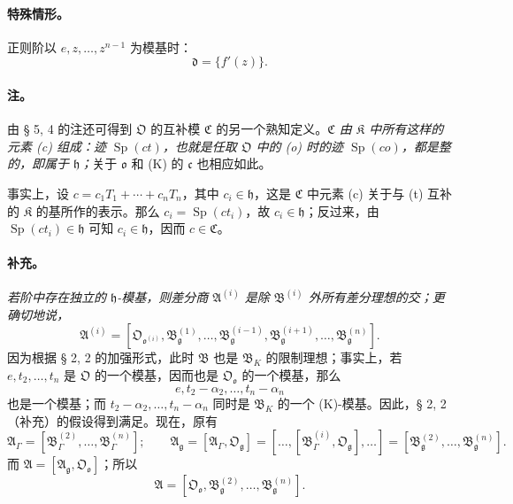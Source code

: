 \paragraph{特殊情形。}
正则阶以 \(e,z,\ldots,z^{n-1}\) 为模基时：
\[
\mathfrak d=\{f'(z)\}.
\]

\paragraph{注。}
由 § 5, 4 的注还可得到 \(\mathfrak O\) 的互补模 \(\mathfrak C\) 的另一个熟知定义。\emph{\(\mathfrak C\) 由 \(\mathfrak K\) 中所有这样的元素 (c) 组成：迹 \(\operatorname{Sp}(ct)\)，也就是任取 \(\mathfrak O\) 中的 (o) 时的迹 \(\operatorname{Sp}(co)\)，都是整的，即属于 \(\mathfrak h\)；}关于 \(\mathfrak o\) 和 (K) 的 \(\mathfrak c\) 也相应如此。

事实上，设 \(c=c_1T_1+\cdots+c_nT_n\)，其中 \(c_i\in\mathfrak h\)，这是 \(\mathfrak C\) 中元素 (c) 关于与 (t) 互补的 \(\mathfrak K\) 的基所作的表示。那么 \(c_i=\operatorname{Sp}(ct_i)\)，故 \(c_i\in\mathfrak h\)；反过来，由 \(\operatorname{Sp}(ct_i)\in\mathfrak h\) 可知 \(c_i\in\mathfrak h\)，因而 \(c\in\mathfrak C\)。

\paragraph{补充。}
\emph{若阶中存在独立的 \(\mathfrak h\)-模基，则差分商 \(\mathfrak A^{(i)}\) 是除 \(\mathfrak B^{(i)}\) 外所有差分理想的交；更确切地说，}
\[
\mathfrak A^{(i)}=
[\mathfrak O_{\mathfrak o^{(i)}},
\mathfrak B_{\mathfrak g}^{(1)},\ldots,
\mathfrak B_{\mathfrak g}^{(i-1)},
\mathfrak B_{\mathfrak g}^{(i+1)},\ldots,
\mathfrak B_{\mathfrak g}^{(n)}].
\]
因为根据 § 2, 2 的加强形式，此时 \(\mathfrak B\) 也是 \(\mathfrak B_K\) 的限制理想；事实上，若 \(e,t_2,\ldots,t_n\) 是 \(\mathfrak O\) 的一个模基，因而也是 \(\mathfrak O_{\mathfrak o}\) 的一个模基，那么
\[
e,t_2-\alpha_2,\ldots,t_n-\alpha_n
\]
也是一个模基；而 \(t_2-\alpha_2,\ldots,t_n-\alpha_n\) 同时是 \(\mathfrak B_K\) 的一个 (K)-模基。因此，§ 2, 2（补充）的假设得到满足。现在，原有
\[
\mathfrak A_\Gamma=[\mathfrak B_\Gamma^{(2)},\ldots,\mathfrak B_\Gamma^{(n)}];
\qquad
\mathfrak A_\mathfrak g=[\mathfrak A_\Gamma,\mathfrak O_\mathfrak g]
=[\ldots,[\mathfrak B_\Gamma^{(i)},\mathfrak O_\mathfrak g],\ldots]
=[\mathfrak B_\mathfrak g^{(2)},\ldots,\mathfrak B_\mathfrak g^{(n)}].
\]
而 \(\mathfrak A=[\mathfrak A_\mathfrak g,\mathfrak O_{\mathfrak o}]\)；所以
\[
\mathfrak A=[\mathfrak O_{\mathfrak o},\mathfrak B_\mathfrak g^{(2)},\ldots,\mathfrak B_\mathfrak g^{(n)}].
\]

